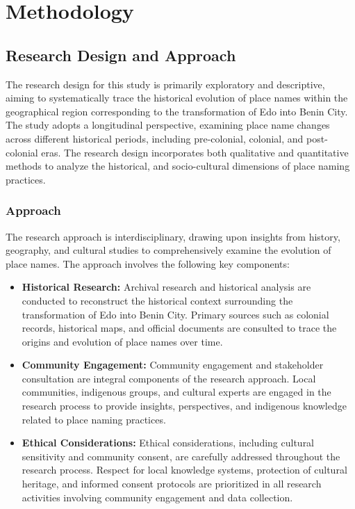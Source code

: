 \chapter{Methodology}

\section{Research Design and Approach}

The research design for this study is primarily exploratory and descriptive, aiming to systematically trace the historical evolution of place names within the geographical region corresponding to the transformation of Edo into Benin City. The study adopts a longitudinal perspective, examining place name changes across different historical periods, including pre-colonial, colonial, and post-colonial eras. The research design incorporates both qualitative and quantitative methods to analyze the historical, and socio-cultural dimensions of place naming practices.

\subsection{Approach}

The research approach is interdisciplinary, drawing upon insights from history, geography, and cultural studies to comprehensively examine the evolution of place names. The approach involves the following key components:

\begin{itemize}
    \item \textbf{Historical Research:} Archival research and historical analysis are conducted to reconstruct the historical context surrounding the transformation of Edo into Benin City. Primary sources such as colonial records, historical maps, and official documents are consulted to trace the origins and evolution of place names over time.
    
    \item \textbf{Community Engagement:} Community engagement and stakeholder consultation are integral components of the research approach. Local communities, indigenous groups, and cultural experts are engaged in the research process to provide insights, perspectives, and indigenous knowledge related to place naming practices.
    
    \item \textbf{Ethical Considerations:} Ethical considerations, including cultural sensitivity and community consent, are carefully addressed throughout the research process. Respect for local knowledge systems, protection of cultural heritage, and informed consent protocols are prioritized in all research activities involving community engagement and data collection.
\end{itemize}

